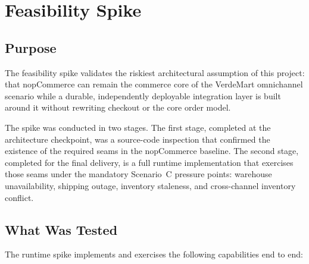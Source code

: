 \chapter{Feasibility Spike}

\section{Purpose}

The feasibility spike validates the riskiest architectural assumption of this project: that
nopCommerce can remain the commerce core of the VerdeMart omnichannel scenario while a
durable, independently deployable integration layer is built around it without rewriting
checkout or the core order model.

The spike was conducted in two stages. The first stage, completed at the architecture
checkpoint, was a source-code inspection that confirmed the existence of the required seams
in the nopCommerce baseline. The second stage, completed for the final delivery, is a full
runtime implementation that exercises those seams under the mandatory Scenario~C pressure
points: warehouse unavailability, shipping outage, inventory staleness, and cross-channel
inventory conflict.

\section{What Was Tested}

The runtime spike implements and exercises the following capabilities end to end:

